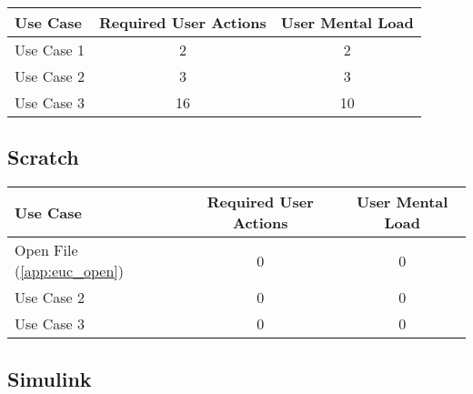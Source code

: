 
\begin{tabularx}{\textwidth}{Xcc}
\textbf{Use Case} & \textbf{Required User Actions} & \textbf{User Mental Load}\\
\hline
Use Case 1                          & 2 & 2 \\
Use Case 2                          & 3 & 3 \\
Use Case 3                          & 16 & 10
\end{tabularx}

\subsection{Scratch}

\begin{tabularx}{\textwidth}{Xcc}
\textbf{Use Case} & \textbf{Required User Actions} & \textbf{User Mental Load}\\
\hline
Open File (\ref{app:euc_open}) & 0 & 0 \\
Use Case 2                     & 0 & 0 \\
Use Case 3                     & 0 & 0
\end{tabularx}

\subsection{Simulink}




